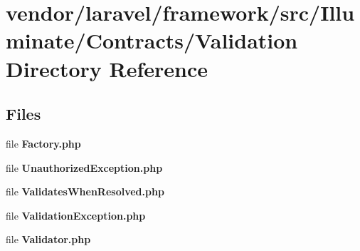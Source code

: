 \section{vendor/laravel/framework/src/\+Illuminate/\+Contracts/\+Validation Directory Reference}
\label{dir_62f54f8dde3153cf3991c61afdaadb39}
\subsection*{Files}
\begin{DoxyCompactItemize}
\item 
file {\bf Factory.\+php}
\item 
file {\bf Unauthorized\+Exception.\+php}
\item 
file {\bf Validates\+When\+Resolved.\+php}
\item 
file {\bf Validation\+Exception.\+php}
\item 
file {\bf Validator.\+php}
\end{DoxyCompactItemize}
